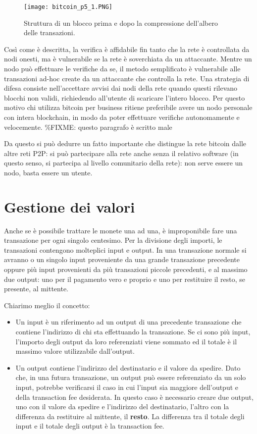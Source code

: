 \begin{figure}[htbp]
\centering
\texttt{[image: bitcoin\_p5\_1.PNG]}
\caption{Struttura di un blocco prima e dopo la compressione dell'albero
delle transazioni.\label{bitcoin_p5_1}}
\end{figure}

Così come è descritta, la verifica è affidabile fin tanto che la rete è
controllata da nodi onesti, ma è vulnerabile se la rete è soverchiata da
un attaccante. Mentre un nodo può effettuare le verifiche da se, il
metodo semplificato è vulnerabile alle transazioni ad-hoc create da un
attaccante che controlla la rete. Una strategia di difesa consiste
nell'accettare avvisi dai nodi della rete quando questi rilevano blocchi
non validi, richiedendo all'utente di scaricare l'intero blocco. Per
questo motivo chi utilizza bitcoin per business ritiene preferibile
avere un nodo personale con intera blockchain, in modo da poter
effettuare verifiche autonomamente e velocemente. \%FIXME: questo
paragrafo è scritto male

Da questo si può dedurre un fatto importante che distingue la rete
bitcoin dalle altre reti P2P: si può partecipare alla rete anche senza
il relativo software (in questo senso, si partecipa al livello
comunitario della rete): non serve essere un nodo, basta essere un
utente.

\section{Gestione dei valori}\label{gestione-dei-valori}

Anche se è possibile trattare le monete una ad una, è improponibile fare
una transazione per ogni singolo centesimo. Per la divisione degli
importi, le transazioni contengono molteplici input e output. In una
transazione normale si avranno o un singolo input proveniente da una
grande transazione precedente oppure più input provenienti da più
transazioni piccole precedenti, e al massimo due output: uno per il
pagamento vero e proprio e uno per restituire il resto, se presente, al
mittente.

Chiarimo meglio il concetto:

\begin{itemize}
\itemsep1pt\parskip0pt
\item
  Un input è un riferimento ad un output di una precedente transazione
  che contiene l'indirizzo di chi sta effettuando la transazione. Se ci
  sono più input, l'importo degli output da loro referenziati viene
  sommato ed il totale è il massimo valore utilizzabile dall'output.
\item
  Un output contiene l'indirizzo del destinatario e il valore da
  spedire. Dato che, in una futura transazione, un output può essere
  referenziato da un solo input, potrebbe verificarsi il caso in cui
  l'input sia maggiore dell'output e della transaction fee desiderata.
  In questo caso è necessario creare due output, uno con il valore da
  spedire e l'indirizzo del destinatario, l'altro con la differenza da
  restituire al mittente, il \textbf{resto}. La differenza tra il totale
  degli input e il totale degli output è la transaction fee.
\end{itemize}

